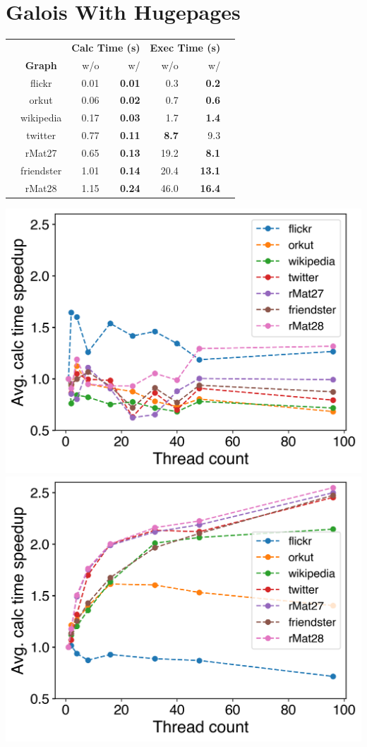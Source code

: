 \documentclass{meetings}
\begin{document}
\section{Galois With Hugepages}
\begin{tabular}{ccr@{\tabskip 2 \tabcolsep}rr@{\tabskip 2 \tabcolsep}rc}
		&&\multicolumn{2}{c}{\bf Calc Time (s)}&\multicolumn{2}{c}{\bf Exec Time (s)}\\
		\cmidrule{3-4}\cmidrule{5-6}
		&\bf Graph&w/o&w/&w/o&w/\\
		\midrule
	\multirow{7}{0.5ex}{\rotatebox{90}{\bf PR Pull}}
		& flickr & 0.01 & \bf 0.01 & 0.3 & \bf 0.2\\
		& orkut & 0.06 & \bf 0.02 & 0.7 & \bf 0.6\\
		& wikipedia & 0.17 & \bf 0.03 & 1.7 & \bf 1.4\\
		& twitter & 0.77 & \bf 0.11 & \bf 8.7 & 9.3\\
		& rMat27 & 0.65 & \bf 0.13 & 19.2 & \bf 8.1\\
		& friendster & 1.01 & \bf 0.14 & 20.4 & \bf 13.1\\
		& rMat28 & 1.15 & \bf 0.24 & 46.0 & \bf 16.4\\
\end{tabular}
\includegraphics[width=0.5\linewidth]{../../plots/singleNodePRPullGaloisThreads.png}
\includegraphics[width=0.5\linewidth]{../../plots/singleNodePRPullGaloisHPThreads.png}
\end{document}
